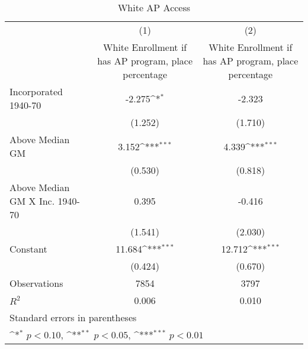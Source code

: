 \begin{table}[htbp]\centering
\def\sym#1{\ifmmode^{#1}\else\(^{#1}\)\fi}
\caption{White AP Access}
\begin{tabular}{l*{2}{c}}
\hline\hline
                    &\multicolumn{1}{c}{(1)}&\multicolumn{1}{c}{(2)}\\
                    &\multicolumn{1}{c}{White Enrollment if has AP program, place percentage}&\multicolumn{1}{c}{White Enrollment if has AP program, place percentage}\\
\hline
Incorporated 1940-70&      -2.275\sym{*}  &      -2.323         \\
                    &     (1.252)         &     (1.710)         \\
[1em]
Above Median GM     &       3.152\sym{***}&       4.339\sym{***}\\
                    &     (0.530)         &     (0.818)         \\
[1em]
Above Median GM X Inc. 1940-70&       0.395         &      -0.416         \\
                    &     (1.541)         &     (2.030)         \\
[1em]
Constant            &      11.684\sym{***}&      12.712\sym{***}\\
                    &     (0.424)         &     (0.670)         \\
\hline
Observations        &        7854         &        3797         \\
\(R^{2}\)           &       0.006         &       0.010         \\
\hline\hline
\multicolumn{3}{l}{\footnotesize Standard errors in parentheses}\\
\multicolumn{3}{l}{\footnotesize \sym{*} \(p<0.10\), \sym{**} \(p<0.05\), \sym{***} \(p<0.01\)}\\
\end{tabular}
\end{table}
